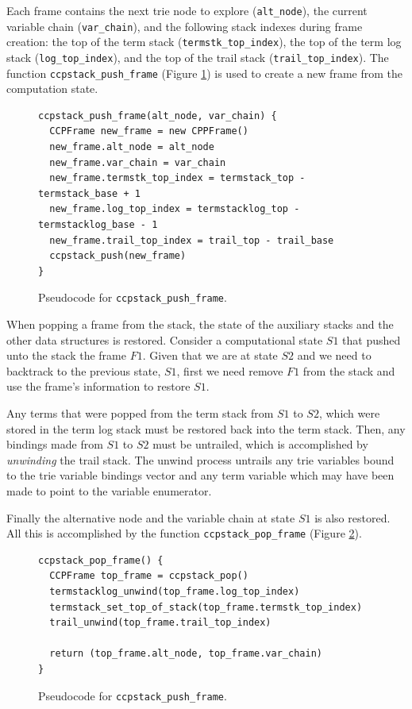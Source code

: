 Each frame contains the next trie node to explore (\texttt{alt\_node}),
the current variable chain (\texttt{var\_chain}),
and the following stack indexes during frame creation:
the top of the term stack (\texttt{termstk\_top\_index}),
the top of the term log stack (\texttt{log\_top\_index}),
and the top of the trail stack (\texttt{trail\_top\_index}).
The function \texttt{ccpstack\_push\_frame} (Figure \ref{fig:ccpstack_push_frame})
is used to create a new frame from the computation state.

\begin{figure}[ht]
\begin{verbatim}
ccpstack_push_frame(alt_node, var_chain) {
  CCPFrame new_frame = new CPPFrame()
  new_frame.alt_node = alt_node
  new_frame.var_chain = var_chain
  new_frame.termstk_top_index = termstack_top - termstack_base + 1
  new_frame.log_top_index = termstacklog_top - termstacklog_base - 1
  new_frame.trail_top_index = trail_top - trail_base
  ccpstack_push(new_frame)
}
\end{verbatim}
\caption{Pseudo\-code for \texttt{ccpstack\_push\_frame}.}
\label{fig:ccpstack_push_frame}
\end{figure}

When popping a frame from the stack, the state of the auxiliary stacks and the other data
structures is restored. Consider a computational state $S1$ that pushed unto the stack
the frame $F1$. Given that we are at state $S2$ and we need to backtrack to the previous state, $S1$,
first we need remove $F1$ from the stack and use the frame's information to restore $S1$.

Any terms that were popped from the term stack from $S1$ to $S2$, which were
stored in the term log stack must be restored back into the term stack.
Then, any bindings made from $S1$ to $S2$ must be untrailed, which is
accomplished by \textit{unwinding} the trail stack. The unwind process untrails
any trie variables bound to the trie variable bindings vector
and any term variable which may have been made to point to the variable enumerator. 

Finally the alternative node and
the variable chain at state $S1$ is also restored. All this is accomplished by the
function \texttt{ccpstack\_pop\_frame} (Figure \ref{fig:ccpstack_pop_frame}).

\begin{figure}[h]
\begin{verbatim}
ccpstack_pop_frame() {
  CCPFrame top_frame = ccpstack_pop()
  termstacklog_unwind(top_frame.log_top_index)
  termstack_set_top_of_stack(top_frame.termstk_top_index)
  trail_unwind(top_frame.trail_top_index)
  
  return (top_frame.alt_node, top_frame.var_chain)
}
\end{verbatim}
\caption{Pseudo\-code for \texttt{ccpstack\_push\_frame}.}
\label{fig:ccpstack_pop_frame}
\end{figure}

